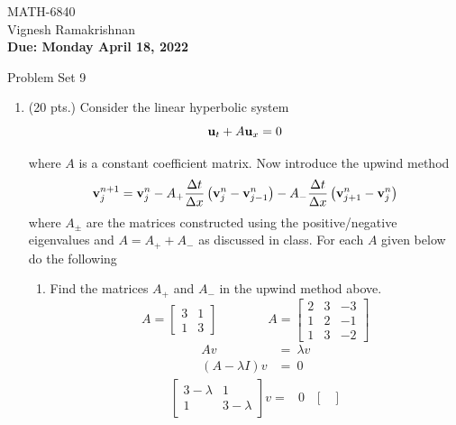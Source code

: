 \documentclass[11pt]{article}
\newcommand{\bu}{{\bf u}}
\newcommand{\bv}{{\bf v}}
\newcommand{\dx}{{\Delta x}}
\newcommand{\dt}{{\Delta t}}
\begin{document}
\begin{flushright}
\small{MATH-6840\\
Vignesh Ramakrishnan\\
{\bf Due: Monday April 18, 2022}}
\end{flushright}

\begin{center}
\large{Problem Set 9}\\
\end{center}

\begin{enumerate}
  \item {\color{red}(20 pts.) Consider the linear hyperbolic system}
    \[
      \bu_t+A\bu_x=0
    \]
  
    {\color{red}where $A$ is a constant coefficient matrix. Now introduce the upwind method}
    \[
      \bv_j^{n+1}=\bv_j^n-A_{+}\frac{\dt}{\dx}\left(\bv_j^n-\bv_{j-1}^n\right)-A_{-}\frac{\dt}{\dx}\left(\bv_{j+1}^n-\bv_{j}^n\right)
    \]
    {\color{red}where $A_{\pm}$ are the matrices constructed using the positive/negative eigenvalues and $A=A_{+}+A_{-}$ as discussed in class. For each $A$ given below do the following}
    \begin{enumerate}
      \item {\color{blue}Find the matrices $A_{+}$ and $A_{-}$ in the upwind method above.} \\
      \[
        A=
        \begin{bmatrix}
          3 & 1 \\
          1 & 3
        \end{bmatrix}
        \qquad \qquad
        A=
        \begin{bmatrix}
        2 & 3 & -3\\
        1 & 2 & -1\\
        1 & 3 & -2
        \end{bmatrix}
      \]      
      \begin{align*}
          Av &= \ \lambda v \\
          (A-\lambda I)v &= \ 0
      \end{align*}
      \begin{align*}
          \begin{bmatrix}
          3-\lambda & 1 \\
          1 & 3-\lambda
          \end{bmatrix}v =& 0 & 
          \begin{bmatrix}

\end{bmatrix}
\end{align*}
\end{enumerate}
\end{enumerate}
\end{document}
